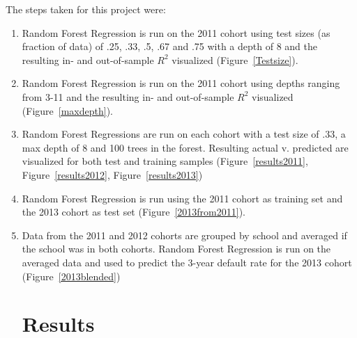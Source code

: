 \documentclass[10pt,twocolumn]{article}
\begin{document}
The steps taken for this project were:
\begin{enumerate}
\item Random Forest Regression is run on the 2011 cohort using test sizes (as fraction of data) of .25, .33,
.5, .67 and .75 with a depth of 8 and the resulting in- and out-of-sample $R^2$
visualized (Figure~\ref{Testsize}).
\item Random Forest Regression is run on the 2011 cohort using depths ranging from 3-11 and the
resulting in- and out-of-sample $R^2$ visualized (Figure~\ref{maxdepth}).
\item Random Forest Regressions are run on each cohort with a test size of .33, a
max depth of 8 and 100 trees in the forest. Resulting actual v. predicted are visualized for both test and training samples
(Figure~\ref{results2011}, Figure~\ref{results2012}, Figure~\ref{results2013})
\item Random Forest Regression is run using the 2011 cohort as training set and the
2013 cohort as test set (Figure~\ref{2013from2011}).
\item Data from the 2011 and 2012 cohorts are grouped by school and averaged if the
school was in both cohorts. Random Forest Regression is run on the averaged data and used to
predict the 3-year default rate for the 2013 cohort (Figure~\ref{2013blended})

\section{Results}


\end{enumerate}
\end{document}
